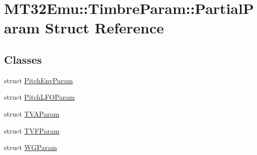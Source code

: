 \hypertarget{structMT32Emu_1_1TimbreParam_1_1PartialParam}{\section{M\-T32\-Emu\-:\-:Timbre\-Param\-:\-:Partial\-Param Struct Reference}
\label{structMT32Emu_1_1TimbreParam_1_1PartialParam}
}
\subsection*{Classes}
\begin{DoxyCompactItemize}
\item 
struct \hyperlink{structMT32Emu_1_1TimbreParam_1_1PartialParam_1_1PitchEnvParam}{Pitch\-Env\-Param}
\item 
struct \hyperlink{structMT32Emu_1_1TimbreParam_1_1PartialParam_1_1PitchLFOParam}{Pitch\-L\-F\-O\-Param}
\item 
struct \hyperlink{structMT32Emu_1_1TimbreParam_1_1PartialParam_1_1TVAParam}{T\-V\-A\-Param}
\item 
struct \hyperlink{structMT32Emu_1_1TimbreParam_1_1PartialParam_1_1TVFParam}{T\-V\-F\-Param}
\item 
struct \hyperlink{structMT32Emu_1_1TimbreParam_1_1PartialParam_1_1WGParam}{W\-G\-Param}
\end{DoxyCompactItemize}
